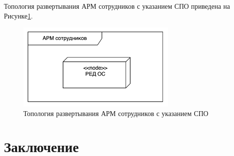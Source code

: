 \documentclass[14pt, a4paper]{extarticle}
\begin{document}
Топология развертывания АРМ сотрудников с указанием СПО приведена на Рисунке\;\ref{fig:deployment_arm}.

\begin{figure}[H]
  \centering
  \includegraphics[width=0.7\textwidth]{deployment_arm.png}
  \caption{Топология развертывания АРМ сотрудников с указанием СПО}
  \label{fig:deployment_arm}
\end{figure}


\section{Заключение}


\begingroup
\let\itshape\upshape
\sloppy
\raggedright
\printbibliography[title=СПИСОК ИСПОЛЬЗУЕМЫХ ИСТОЧНИКОВ]
{}
\endgroup
\end{document}
